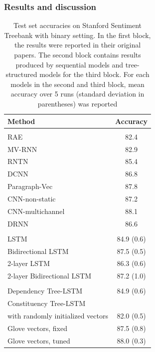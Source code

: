 \subsubsection{Results and discussion}
\begin{table}[H]
\centering
\begin{tabular}{l c}
 \hline
 \hline
 Method & Accuracy \\ [0.5ex]
 \hline
 \hline
 \\
 RAE~\cite{socher2013recursive} & 82.4 \\
 MV-RNN~\cite{socher2013recursive} & 82.9 \\
 RNTN~\cite{socher2013recursive} & 85.4 \\
 DCNN~\cite{DCNN} & 86.8 \\
 Paragraph-Vec~\cite{ParagraphVec} & 87.8 \\
 CNN-non-static~\cite{KimCNN} & 87.2 \\
 CNN-multichannel~\cite{KimCNN} & 88.1 \\
 DRNN~\cite{IrsoyDRNN} & 86.6 \\ [0.5ex]
 \hline
 \\
 LSTM~\cite{originLSTM} & 84.9 (0.6) \\
 Bidirectional LSTM~\cite{GravesLSTM} & 87.5 (0.5) \\
 2-layer LSTM~\cite{GravesLSTM} & 86.3 (0.6) \\
 2-layer Bidirectional LSTM~\cite{GravesLSTM} & 87.2 (1.0) \\ [0.5ex]
 \hline
 \\
 Dependency Tree-LSTM~\cite{treeLSTM} & 84.9 (0.6) \\
 Constituency Tree-LSTM~\cite{treeLSTM} &  \\
 \; with randomly initialized vectors & 82.0 (0.5) \\
 \; Glove vectors, fixed & 87.5 (0.8) \\
 \; Glove vectors, tuned & 88.0 (0.3) \\
 \hline
 \hline
\end{tabular}
\caption[Tree-LSTM test result]{Test set accuracies on Stanford Sentiment Treebank with binary setting.
In the first block, the results were reported in their original papers.
The second block contains results produced by sequential models and tree-structured models for the third block.
For each models in the second and third block, mean accuracy over 5 runs (standard deviation in parentheses) was reported}
\label{table:1}
\end{table}

